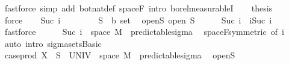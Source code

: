 \begin{isabellebody}
\ {\isacharparenleft}{\kern0pt}fastforce\ simp\ add{\isacharcolon}{\kern0pt}\ bot{\isacharunderscore}{\kern0pt}nat{\isacharunderscore}{\kern0pt}def\ space{\isacharunderscore}{\kern0pt}F\ intro{\isacharbang}{\kern0pt}{\isacharcolon}{\kern0pt}\ borel{\isacharunderscore}{\kern0pt}measurableI{\isacharparenright}{\kern0pt}\isanewline
\ \ \isamarkupfalse%
\ {\isacharquery}{\kern0pt}thesis\ \isamarkupfalse%
\ {}\ \isamarkupfalse%
\ force\isanewline
{}\isamarkupfalse%
\isanewline
\ \ \isamarkupfalse%
\ {\isacharparenleft}{\kern0pt}Suc\ i{\isacharparenright}{\kern0pt}\isanewline
\ \ \isacommand{{\isacharbraceleft}{\kern0pt}}\isamarkupfalse%
\isanewline
\ \ \ \ \isamarkupfalse%
\ S\ {\isacharcolon}{\kern0pt}{\isacharcolon}{\kern0pt}\ {\isachardoublequoteopen}{\isacharprime}{\kern0pt}b\ set{\isachardoublequoteclose}\ \isamarkupfalse%
\ open{\isacharunderscore}{\kern0pt}S{\isacharcolon}{\kern0pt}\ {\isachardoublequoteopen}open\ S{\isachardoublequoteclose}\isanewline
\ \ \ \ \isamarkupfalse%
\ {\isachardoublequoteopen}{\isacharbraceleft}{\kern0pt}Suc\ i{\isacharbraceright}{\kern0pt}\ {\isacharequal}{\kern0pt}\ {\isacharbraceleft}{\kern0pt}i{\isacharless}{\kern0pt}{\isachardot}{\kern0pt}{\isachardot}{\kern0pt}Suc\ i{\isacharbraceright}{\kern0pt}{\isachardoublequoteclose}\ \isamarkupfalse%
\ fastforce\isanewline
\ \ \ \ \isamarkupfalse%
\ {\isachardoublequoteopen}{\isacharbraceleft}{\kern0pt}Suc\ i{\isacharbraceright}{\kern0pt}\ {\isasymtimes}\ space\ M\ {\isasymin}\ predictable{\isacharunderscore}{\kern0pt}sigma{\isachardoublequoteclose}\ \isamarkupfalse%
\ space{\isacharunderscore}{\kern0pt}F{\isacharbrackleft}{\kern0pt}symmetric{\isacharcomma}{\kern0pt}\ of\ i{\isacharbrackright}{\kern0pt}\ \isamarkupfalse%
\ {\isacharparenleft}{\kern0pt}auto\ intro{\isacharbang}{\kern0pt}{\isacharcolon}{\kern0pt}\ sigma{\isacharunderscore}{\kern0pt}sets{\isachardot}{\kern0pt}Basic{\isacharparenright}{\kern0pt}\isanewline
\ \ \ \ \isamarkupfalse%
\ \isamarkupfalse%
\ {\isachardoublequoteopen}case{\isacharunderscore}{\kern0pt}prod\ X\ {\isacharminus}{\kern0pt}{\isacharbackquote}{\kern0pt}\ S\ {\isasyminter}\ {\isacharparenleft}{\kern0pt}UNIV\ {\isasymtimes}\ space\ M{\isacharparenright}{\kern0pt}\ {\isasymin}\ predictable{\isacharunderscore}{\kern0pt}sigma{\isachardoublequoteclose}\ \isamarkupfalse%
\ open{\isacharunderscore}{\kern0pt}S\ \isamarkupfalse%

\end{isabellebody}
